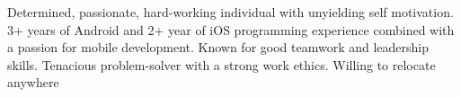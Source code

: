

\begin{cvparagraph}

Determined, passionate, hard-working individual with unyielding self motivation. 3+ years of Android and 2+ year of iOS programming experience combined with a passion for mobile development. Known for good teamwork and leadership skills. Tenacious problem-solver with a strong work ethics. Willing to relocate anywhere
\end{cvparagraph}
